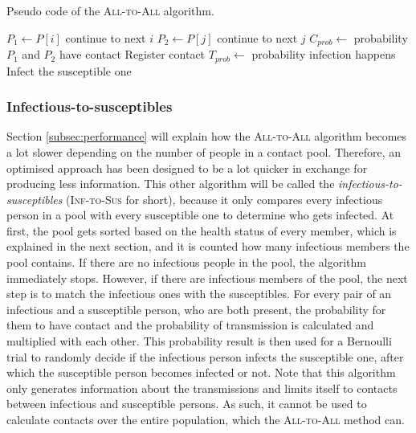 \begin{algorithm}
\caption{Pseudo code of the \textsc{All-to-All} algorithm.}
\label{alg:all-to-all}
\begin{algorithmic}[1]
    \;
    \Statex
        \State $P_{1} \gets P[i]$
            \State continue to next $i$
        \EndIf
            \State $P_{2} \gets P[j]$
                \State continue to next $j$
            \EndIf
            \Statex
            \State $C_{prob} \gets$ probability $P_{1}$ and $P_{2}$ have contact
                \State Register contact
                    \State $T_{prob} \gets$ probability infection happens
                        \State Infect the susceptible one
                    \EndIf
                \EndIf
            \EndIf
        \EndFor
    \EndFor
\end{algorithmic}
\end{algorithm}

\subsubsection{Infectious-to-susceptibles}
Section \ref{subsec:performance} will explain how the \textsc{All-to-All} algorithm becomes a lot slower depending on the number of people in a contact pool. Therefore, an optimised approach has been designed to be a lot quicker in exchange for producing less information. This other algorithm will be called the \textit{infectious-to-susceptibles} (\textsc{Inf-to-Sus} for short), because it only compares every infectious person in a pool with every susceptible one to determine who gets infected. At first, the pool gets sorted based on the health status of every member, which is explained in the next section, and it is counted how many infectious members the pool contains. If there are no infectious people in the pool, the algorithm immediately stops. However, if there are infectious members of the pool, the next step is to match the infectious ones with the susceptibles. For every pair of an infectious and a susceptible person, who are both present, the probability for them to have contact and the probability of transmission is calculated and multiplied with each other. This probability result is then used for a Bernoulli trial to randomly decide if the infectious person infects the susceptible one, after which the susceptible person becomes infected or not. Note that this algorithm only generates information about the transmissions and limits itself to contacts between infectious and susceptible persons. As such, it cannot be used to calculate contacts over the entire population, which the \textsc{All-to-All} method can.

